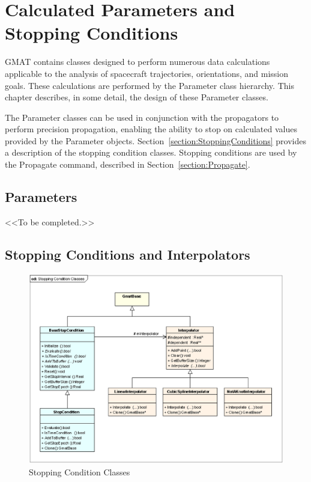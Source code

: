 \chapter{\label{chapter:Parameters}Calculated Parameters and Stopping Conditions}

GMAT contains classes designed to perform numerous data calculations applicable to the analysis of
spacecraft trajectories, orientations, and mission goals.  These calculations are performed by the
Parameter class hierarchy.  This chapter describes, in some detail, the design of these Parameter
classes.

The Parameter classes can be used in conjunction with the propagators to perform precision
propagation, enabling the ability to stop on calculated values provided by the Parameter objects.
Section~\ref{section:StoppingConditions} provides a description of the stopping condition classes.
Stopping conditions are used by the Propagate command, described in Section~\ref{section:Propagate}.

\section{\label{section:Parameters}Parameters}

<<To be completed.>>

\section{\label{section:StoppingConditions}Stopping Conditions and Interpolators}

\begin{figure}[htb]
\begin{center}
\includegraphics[scale=0.5]{Images/StoppingConditionClasses.eps}
\caption{\label{figure:StoppingConditionClasses}Stopping Condition Classes}
\end{center}
\end{figure}

